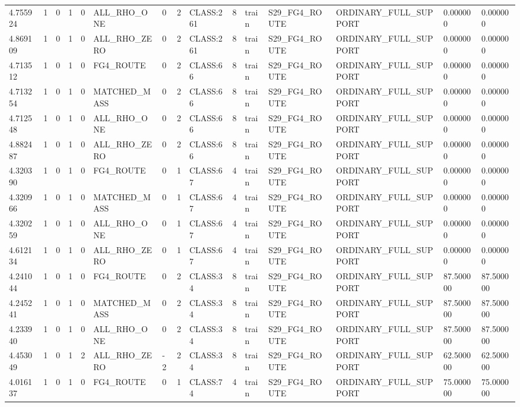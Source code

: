 \begin{tabular}{lllllllllllllll}
4.755924 & 1 & 0 & 1 & 0 & ALL\_RHO\_ONE & 0 & 2 & CLASS:261 & 8 & train & S29\_FG4\_ROUTE & ORDINARY\_FULL\_SUPPORT & 0.000000 & 0.000000 \\
4.869109 & 1 & 0 & 1 & 0 & ALL\_RHO\_ZERO & 0 & 2 & CLASS:261 & 8 & train & S29\_FG4\_ROUTE & ORDINARY\_FULL\_SUPPORT & 0.000000 & 0.000000 \\
4.713512 & 1 & 0 & 1 & 0 & FG4\_ROUTE & 0 & 2 & CLASS:66 & 8 & train & S29\_FG4\_ROUTE & ORDINARY\_FULL\_SUPPORT & 0.000000 & 0.000000 \\
4.713254 & 1 & 0 & 1 & 0 & MATCHED\_MASS & 0 & 2 & CLASS:66 & 8 & train & S29\_FG4\_ROUTE & ORDINARY\_FULL\_SUPPORT & 0.000000 & 0.000000 \\
4.712548 & 1 & 0 & 1 & 0 & ALL\_RHO\_ONE & 0 & 2 & CLASS:66 & 8 & train & S29\_FG4\_ROUTE & ORDINARY\_FULL\_SUPPORT & 0.000000 & 0.000000 \\
4.882487 & 1 & 0 & 1 & 0 & ALL\_RHO\_ZERO & 0 & 2 & CLASS:66 & 8 & train & S29\_FG4\_ROUTE & ORDINARY\_FULL\_SUPPORT & 0.000000 & 0.000000 \\
4.320390 & 1 & 0 & 1 & 0 & FG4\_ROUTE & 0 & 1 & CLASS:67 & 4 & train & S29\_FG4\_ROUTE & ORDINARY\_FULL\_SUPPORT & 0.000000 & 0.000000 \\
4.320966 & 1 & 0 & 1 & 0 & MATCHED\_MASS & 0 & 1 & CLASS:67 & 4 & train & S29\_FG4\_ROUTE & ORDINARY\_FULL\_SUPPORT & 0.000000 & 0.000000 \\
4.320259 & 1 & 0 & 1 & 0 & ALL\_RHO\_ONE & 0 & 1 & CLASS:67 & 4 & train & S29\_FG4\_ROUTE & ORDINARY\_FULL\_SUPPORT & 0.000000 & 0.000000 \\
4.612134 & 1 & 0 & 1 & 0 & ALL\_RHO\_ZERO & 0 & 1 & CLASS:67 & 4 & train & S29\_FG4\_ROUTE & ORDINARY\_FULL\_SUPPORT & 0.000000 & 0.000000 \\
4.241044 & 1 & 0 & 1 & 0 & FG4\_ROUTE & 0 & 2 & CLASS:34 & 8 & train & S29\_FG4\_ROUTE & ORDINARY\_FULL\_SUPPORT & 87.500000 & 87.500000 \\
4.245241 & 1 & 0 & 1 & 0 & MATCHED\_MASS & 0 & 2 & CLASS:34 & 8 & train & S29\_FG4\_ROUTE & ORDINARY\_FULL\_SUPPORT & 87.500000 & 87.500000 \\
4.233940 & 1 & 0 & 1 & 0 & ALL\_RHO\_ONE & 0 & 2 & CLASS:34 & 8 & train & S29\_FG4\_ROUTE & ORDINARY\_FULL\_SUPPORT & 87.500000 & 87.500000 \\
4.453049 & 1 & 0 & 1 & 2 & ALL\_RHO\_ZERO & -2 & 2 & CLASS:34 & 8 & train & S29\_FG4\_ROUTE & ORDINARY\_FULL\_SUPPORT & 62.500000 & 62.500000 \\
4.016137 & 1 & 0 & 1 & 0 & FG4\_ROUTE & 0 & 1 & CLASS:74 & 4 & train & S29\_FG4\_ROUTE & ORDINARY\_FULL\_SUPPORT & 75.000000 & 75.000000 \\

\end{tabular}
